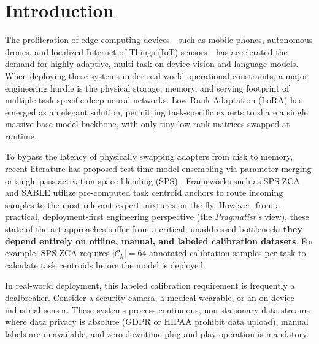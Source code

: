 \section{Introduction}
\label{sec:intro}

The proliferation of edge computing devices—such as mobile phones, autonomous drones, and localized Internet-of-Things (IoT) sensors—has accelerated the demand for highly adaptive, multi-task on-device vision and language models. When deploying these systems under real-world operational constraints, a major engineering hurdle is the physical storage, memory, and serving footprint of multiple task-specific deep neural networks. Low-Rank Adaptation (LoRA) \cite{hu2021lora} has emerged as an elegant solution, permitting task-specific experts to share a single massive base model backbone, with only tiny low-rank matrices swapped at runtime. 

To bypass the latency of physically swapping adapters from disk to memory, recent literature has proposed test-time model ensembling via parameter merging \cite{adamerging} or single-pass activation-space blending (SPS) \cite{sps_zca}. Frameworks such as SPS-ZCA and SABLE \cite{sps_zca, sable} utilize pre-computed task centroid anchors to route incoming samples to the most relevant expert mixtures on-the-fly. However, from a practical, deployment-first engineering perspective (the \emph{Pragmatist's} view), these state-of-the-art approaches suffer from a critical, unaddressed bottleneck: \textbf{they depend entirely on offline, manual, and labeled calibration datasets}. For example, SPS-ZCA requires $|\mathcal{C}_k|=64$ annotated calibration samples per task to calculate task centroids before the model is deployed. 

In real-world deployment, this labeled calibration requirement is frequently a dealbreaker. Consider a security camera, a medical wearable, or an on-device industrial sensor. These systems process continuous, non-stationary data streams where data privacy is absolute (GDPR or HIPAA prohibit data upload), manual labels are unavailable, and zero-downtime plug-and-play operation is mandatory. 

